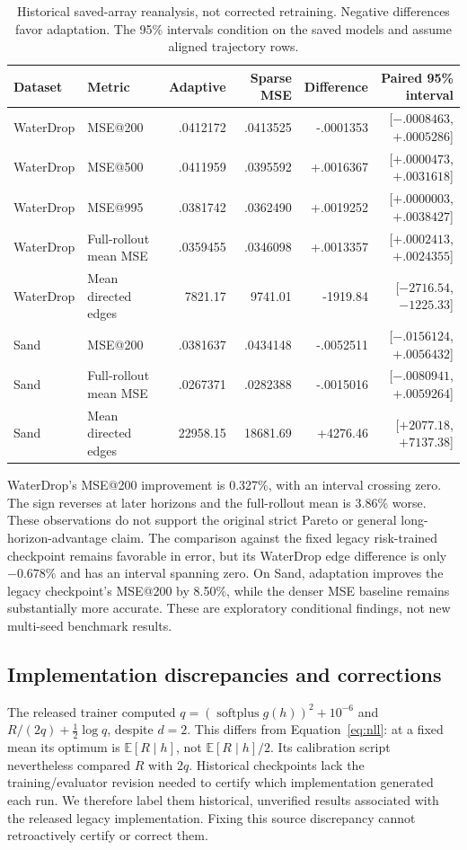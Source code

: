 \begin{table}[t]
\centering\small
\caption{Historical saved-array reanalysis, not corrected retraining. Negative differences favor adaptation. The 95\% intervals condition on the saved models and assume aligned trajectory rows.}
\label{tab:legacy}
\begin{tabular}{llrrrr}
\toprule
Dataset & Metric & Adaptive & Sparse MSE & Difference & Paired 95\% interval\\
\midrule
WaterDrop & MSE@200 & .0412172 & .0413525 & -.0001353 & [$-.0008463$,$+.0005286$]\\
WaterDrop & MSE@500 & .0411959 & .0395592 & +.0016367 & [$+.0000473$,$+.0031618$]\\
WaterDrop & MSE@995 & .0381742 & .0362490 & +.0019252 & [$+.0000003$,$+.0038427$]\\
WaterDrop & Full-rollout mean MSE & .0359455 & .0346098 & +.0013357 & [$+.0002413$,$+.0024355$]\\
WaterDrop & Mean directed edges & 7821.17 & 9741.01 & -1919.84 & [$-2716.54$,$-1225.33$]\\
Sand & MSE@200 & .0381637 & .0434148 & -.0052511 & [$-.0156124$,$+.0056432$]\\
Sand & Full-rollout mean MSE & .0267371 & .0282388 & -.0015016 & [$-.0080941$,$+.0059264$]\\
Sand & Mean directed edges & 22958.15 & 18681.69 & +4276.46 & [$+2077.18$,$+7137.38$]\\
\bottomrule
\end{tabular}
\end{table}

WaterDrop's MSE@200 improvement is 0.327\%, with an interval crossing zero. The sign reverses at later horizons and the full-rollout mean is 3.86\% worse. These observations do not support the original strict Pareto or general long-horizon-advantage claim. The comparison against the fixed legacy risk-trained checkpoint remains favorable in error, but its WaterDrop edge difference is only $-0.678\%$ and has an interval spanning zero. On Sand, adaptation improves the legacy checkpoint's MSE@200 by 8.50\%, while the denser MSE baseline remains substantially more accurate. These are exploratory conditional findings, not new multi-seed benchmark results.

\subsection{Implementation discrepancies and corrections}
The released trainer computed $q=(\operatorname{softplus}g(h))^2+10^{-6}$ and $R/(2q)+\tfrac12\log q$, despite $d=2$. This differs from Equation~\ref{eq:nll}: at a fixed mean its optimum is $\mathbb E[R\mid h]$, not $\mathbb E[R\mid h]/2$. Its calibration script nevertheless compared $R$ with $2q$. Historical checkpoints lack the training/evaluator revision needed to certify which implementation generated each run. We therefore label them historical, unverified results associated with the released legacy implementation. Fixing this source discrepancy cannot retroactively certify or correct them.

